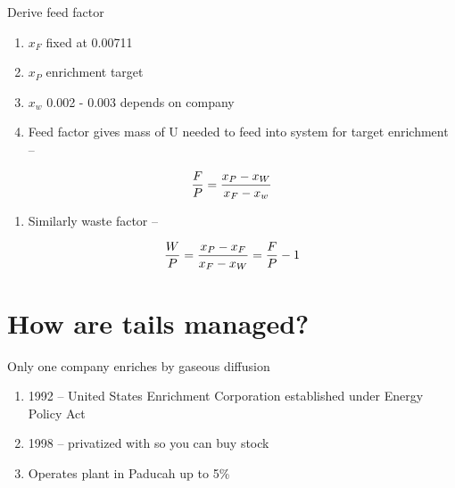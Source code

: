 \documentclass[aspectratio=1610,pdftex,dvipsnames,compress,xcolor={dvipsnames}]{beamer}
\begin{document}
\begin{frame}{Derive feed factor}
    \begin{enumerate}[topsep=0pt,itemsep=11pt,leftmargin=*,label=(\arabic*)]
        \item[]$x_F$ fixed at 0.00711
        \item[]$x_P$ enrichment target
        \item[]$x_w$ 0.002 - 0.003 depends on company
            \vspace{0.10in}
        \item[]Feed factor gives mass of U needed to feed into system for target enrichment  --
    \end{enumerate}

    \vspace*{\fill}

    \begin{equation}
        \LARGE
        \frac{F}{P} = \frac{x_P-x_W}{x_F-x_w}
    \end{equation}
    
    \vspace*{\fill}

    \begin{enumerate}[topsep=0pt,itemsep=11pt,leftmargin=*,label=(\arabic*)]
        \item[]Similarly waste factor --
    \end{enumerate}

    \vspace*{\fill}

    \begin{equation}
        \LARGE
        \frac{W}{P} = \frac{x_P-x_F}{x_F-x_W} = \frac{F}{P} - 1
    \end{equation}
\end{frame}


\section{How are tails managed?}


\addtocounter{framenumber}{-1} 
\begin{frame}{Only one company enriches by gaseous diffusion}
    \begin{enumerate}[topsep=0pt,itemsep=21pt,leftmargin=*,label=(\arabic*)]
        \item[]1992 -- United States Enrichment Corporation established under Energy Policy Act
        \item[]1998 -- privatized with so you can buy stock
        \item[]Operates plant in Paducah up to 5\%
    \end{enumerate}
\end{frame}
\end{document}
